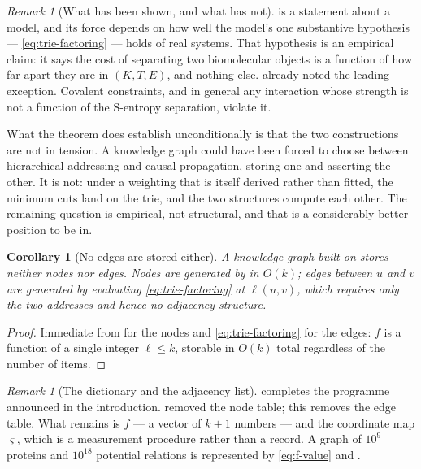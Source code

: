 \documentclass[11pt,twocolumn,a4paper]{article}
\theoremstyle{thmstyle}
\newtheorem{corollary}[theorem]{Corollary}
\theoremstyle{definition}
\theoremstyle{remark}
\newtheorem{remark}[theorem]{Remark}
\newcommand{\sse}{\varsigma}
\begin{document}
\begin{remark}[What has been shown, and what has not]
\label{rem:identity-honest}
 is a statement about a model, and its force depends
on how well the model's one substantive hypothesis ---
\eqref{eq:trie-factoring} --- holds of real systems. That hypothesis is
an empirical claim: it says the cost of separating two biomolecular
objects is a function of how far apart they are in $(K,T,E)$, and
nothing else.  already noted the leading
exception. Covalent constraints, and in general any interaction whose
strength is not a function of the S-entropy separation, violate it.

What the theorem does establish unconditionally is that the two
constructions are not in tension. A knowledge graph could have been
forced to choose between hierarchical addressing and causal
propagation, storing one and asserting the other. It is not: under a
weighting that is itself derived rather than fitted, the minimum cuts
land on the trie, and the two structures compute each other. The
remaining question is empirical, not structural, and that is a
considerably better position to be in.
\end{remark}

\begin{corollary}[No edges are stored either]
\label{cor:no-edges}
A knowledge graph built on  stores neither nodes nor
edges. Nodes are generated by  in $O(k)$; edges
between $u$ and $v$ are generated by evaluating
\eqref{eq:trie-factoring} at $\ell(u,v)$, which requires only the two
addresses and hence no adjacency structure.
\end{corollary}

\begin{proof}
Immediate from  for the nodes and
\eqref{eq:trie-factoring} for the edges: $f$ is a function of a single
integer $\ell \leq k$, storable in $O(k)$ total regardless of the number
of items.
\end{proof}

\begin{remark}[The dictionary and the adjacency list]
 completes the programme announced in the
introduction.  removed the node table; this
removes the edge table. What remains is $f$ --- a vector of $k+1$
numbers --- and the coordinate map $\sse$, which is a measurement
procedure rather than a record. A graph of $10^{9}$ proteins and
$10^{18}$ potential relations is represented by
\eqref{eq:f-value} and .
\end{remark}
\end{document}

